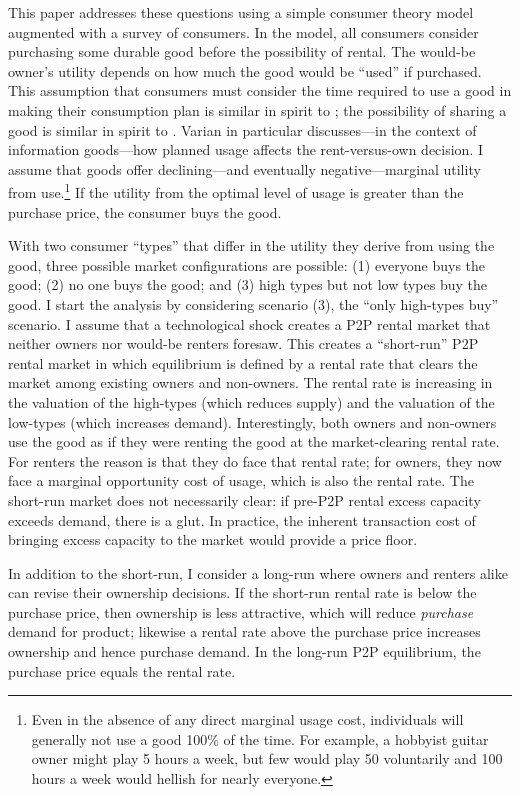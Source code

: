 \documentclass[11pt]{article}
\begin{document}
This paper addresses these questions using a simple consumer theory model augmented with a survey of consumers. 
In the model, all consumers consider purchasing some durable good before the possibility of rental.   
The would-be owner's utility depends on how much the good would be ``used'' if purchased. 
This assumption that consumers must consider the time required to use a good in making their consumption plan is similar in spirit to \cite{becker1965theory}; the possibility of sharing a good is similar in spirit to \cite{varian2000}.
Varian in particular discusses---in the context of information goods---how planned usage affects the rent-versus-own decision.  
I assume that goods offer declining---and eventually negative---marginal utility from use.\footnote{Even in the absence of any direct marginal usage cost, individuals will generally not use a good 100\% of the time. 
For example, a hobbyist guitar owner might play 5 hours a week, but few would play 50 voluntarily and 100 hours a week would hellish for nearly everyone.} 
If the utility from the optimal level of usage is greater than the purchase price, the consumer buys the good. 

With two consumer ``types'' that differ in the utility they derive from using the good, three possible market configurations are possible: 
(1) everyone buys the good; (2) no one buys the good;  and (3) high types but not low types buy the good.  
I start the analysis by considering scenario (3), the  ``only high-types buy'' scenario. 
I assume that a technological shock creates a P2P rental market that neither owners nor would-be renters foresaw. 
This creates a ``short-run'' P2P rental market in which equilibrium is defined by a rental rate that clears the market among existing owners and non-owners. 
The rental rate is increasing in the valuation of the high-types (which reduces supply) and the valuation of the low-types (which increases demand). 
Interestingly, both owners and non-owners use the good as if they were renting the good at the market-clearing rental rate. 
For renters the reason is that they do face that rental rate; 
for owners, they now face a marginal opportunity cost of usage, which is also the rental rate. 
The short-run market does not necessarily clear: if pre-P2P rental excess capacity exceeds demand, there is a glut. 
In practice, the inherent transaction cost of bringing excess capacity to the market would provide a price floor.     

In addition to the short-run, I consider a long-run where owners and renters alike can revise their ownership decisions. 
If the short-run rental rate is below the purchase price, then ownership is less attractive, which will reduce \emph{purchase} demand for product; likewise a rental rate above the purchase price increases ownership and hence purchase demand.
In the long-run P2P equilibrium, the purchase price equals the rental rate.  
\end{document}

